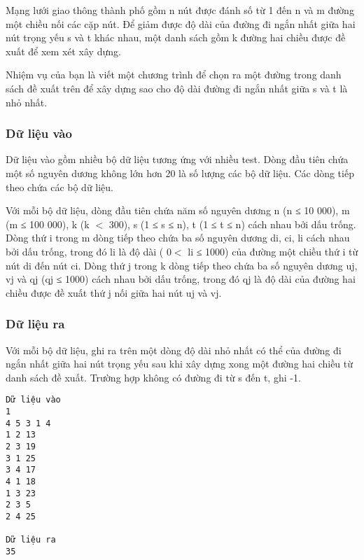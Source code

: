 



   Mạng lưới giao thông thành phố gồm n nút được đánh số từ 1 đến n và m đường một chiều nối các cặp nút. Để giảm được độ dài của đường đi ngắn nhất giữa hai nút trọng yếu s và t khác nhau, một danh sách gồm k đường hai chiều được đề xuất để xem xét xây dựng.  

   Nhiệm vụ của bạn là viết một chương trình để chọn ra một đường trong danh sách đề xuất trên để xây dựng sao cho độ dài đường đi ngắn nhất giữa s và t là nhỏ nhất.  

\subsubsection{   Dữ liệu vào  }

   Dữ liệu vào gồm nhiều bộ dữ liệu tương ứng với nhiều test. Dòng đầu tiên chứa một số nguyên dương không lớn hơn 20 là số lượng các bộ dữ liệu. Các dòng tiếp theo chứa các bộ dữ liệu.  

   Với mỗi bộ dữ liệu, dòng đầu tiên chứa năm số nguyên dương n (n ≤ 10 000), m (m ≤ 100 000), k (k $<$ 300), s (1 ≤ s ≤ n), t (1 ≤ t ≤ n) cách nhau bởi dấu trống. Dòng thứ i trong m dòng tiếp theo chứa ba số nguyên dương di, ci, li cách nhau bởi dấu trống, trong đó li là độ dài  ( 0$<$ li ≤ 1000) của đường một chiều thứ i từ nút  di đến nút ci. Dòng thứ j trong k dòng tiếp theo chứa ba số nguyên dương uj, vj và qj (qj ≤ 1000) cách nhau bởi dấu trống, trong đó qj là độ dài của đường hai chiều được đề xuất thứ j nối giữa hai nút uj và vj.  

\subsubsection{   Dữ liệu ra  }

   Với mỗi bộ dữ liệu, ghi ra trên một dòng độ dài nhỏ nhất có thể của đường đi ngắn nhất giữa hai nút trọng yếu sau khi xây dựng xong một đường hai chiều từ danh sách đề xuất. Trường hợp không có đường đi từ s đến t, ghi -1.  
\begin{verbatim}
Dữ liệu vào
1
4 5 3 1 4
1 2 13
2 3 19
3 1 25
3 4 17
4 1 18
1 3 23
2 3 5
2 4 25	

Dữ liệu ra
35
\end{verbatim}